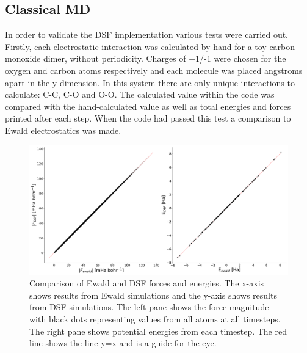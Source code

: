 \subsection{Classical MD}
\label{sect:ClassicalMDEwald}
In order to validate the DSF implementation various tests were carried out. Firstly, each electrostatic interaction was calculated by hand for a toy carbon monoxide dimer, without periodicity. Charges of +1/-1 were chosen for the oxygen and carbon atoms respectively and each molecule was placed  angstroms apart in the y dimension. In this system there are only  unique interactions to calculate: C-C, C-O and O-O. The calculated value within the code was compared with the hand-calculated value as well as total energies and forces printed after each step. When the code had passed this test a comparison to Ewald electrostatics was made.
\\
\begin{figure}[ht]
  \includegraphics[width=\textwidth]{../img/ES/Ewald_DSF_Classical.png}
  \caption{\label{fig:Classical_DSF_Ewald}Comparison of Ewald and DSF forces and energies. The x-axis shows results from Ewald simulations and the y-axis shows results from DSF simulations. The left pane shows the force magnitude with black dots representing values from all atoms at all timesteps. The right pane shows potential energies from each timestep. The red line shows the line y=x and is a guide for the eye.}
\end{figure}
\\
